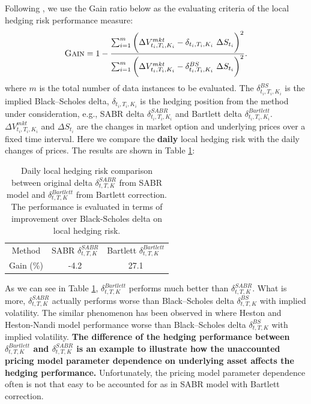 \documentclass[letterpaper,12pt,titlepage,oneside,final]{book}
\numberwithin{equation}{section}
\theoremstyle{definition}
\begin{document}
\begin{itemize}
    Following \cite{hulloptimal},  we use the Gain ratio below as the evaluating criteria of the local hedging risk performance measure:
    \begin{equation}
    \textsc{Gain}=1-\frac{\sum_{i=1}^m \bigg(\Delta V^{mkt}_{t_i,T_i,K_i}-\delta_{t_i,T_i,K_i} ~ \Delta S_{t_i} \bigg)^2}{\sum_{i=1}^m \bigg(\Delta V^{mkt}_{t_i,T_i,K_i}-\delta^{BS}_{t_i,T_i,K_i} ~ \Delta S_{t_i} \bigg)^2}.
    \label{eq:Gain}
    \end{equation}
    where $m$ is the total number of data instances to be evaluated.  The $\delta^{BS}_{t_i,T_i,K_i}$ is the implied Black–Scholes delta, $\delta_{t_i,T_i,K_i}$  is the hedging position from the method under consideration,  e.g., SABR delta $\delta^{SABR}_{t_i,T_i,K_i}$ and  Bartlett delta $\delta^{Bartlett}_{t_i,T_i,K_i}$. $\Delta V^{mkt}_{t_i,T_i,K_i}$ and $\Delta S_{t_i}$
    are the changes in market option and underlying prices over a fixed time interval. Here we compare the \textbf{daily} local hedging risk with the daily changes of prices. The results are shown in Table \ref{table:Bartlett}:
    \begin{table}[htp!]
        \centering
        \begin{tabular}{|c|c|c|}
            \hline
            Method& SABR $\delta^{SABR}_{t,T,K}$ & Bartlett $\delta^{Bartlett}_{t,T,K}$\\
            Gain (\%) &-4.2 & 27.1 \\
            \hline
        \end{tabular}
        \caption{Daily local hedging risk comparison between original delta $\delta^{SABR}_{t,T,K}$ from SABR model and  $\delta^{Bartlett}_{t,T,K}$ from Bartlett correction. The performance is evaluated in terms of improvement over Black-Scholes delta on local hedging risk.}
        \label{table:Bartlett}
    \end{table}
    As we can see in Table \ref{table:Bartlett}, $\delta^{Bartlett}_{t,T,K}$ performs much better than $\delta^{SABR}_{t,T,K}$. What is more, $\delta^{SABR}_{t,T,K}$ actually performs worse than Black–Scholes delta $\delta^{BS}_{t,T,K}$ with implied volatility. The similar phenomenon has been observed in \cite{lassance2018comparison} where Heston and Heston-Nandi model performance worse than Black–Scholes delta $\delta^{BS}_{t,T,K}$ with implied volatility.  \textbf{The difference of the hedging performance between $\delta^{Bartlett}_{t,T,K}$ and $\delta^{SABR}_{t,T,K}$ is an example to illustrate how the unaccounted  pricing model parameter dependence on underlying asset affects the hedging performance. }Unfortunately, the pricing model parameter dependence often is not that easy to be accounted for as in SABR model with Bartlett correction.
\end{itemize}
\end{document}
